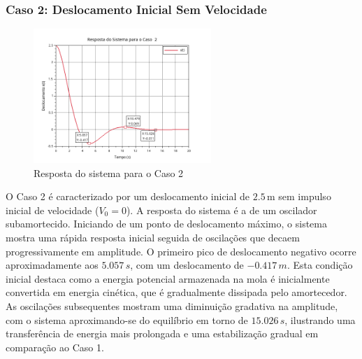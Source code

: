 \subsubsection{Caso 2: Deslocamento Inicial Sem Velocidade}
\begin{figure}[H]
    \centering
    \includegraphics[width=0.6\textwidth]{atividades/1-atividade/assets/caso2.png}
    \caption{Resposta do sistema para o Caso 2}
\end{figure}
O Caso 2 é caracterizado por um deslocamento inicial de \(2.5 \, \text{m}\) sem impulso inicial de velocidade (\(V_0 = 0\)). A resposta do sistema é a de um oscilador subamortecido. Iniciando de um ponto de deslocamento máximo, o sistema mostra uma rápida resposta inicial seguida de oscilações que decaem progressivamente em amplitude. O primeiro pico de deslocamento negativo ocorre aproximadamente aos \(5.057 \, s\), com um deslocamento de \(-0.417 \, m\). Esta condição inicial destaca como a energia potencial armazenada na mola é inicialmente convertida em energia cinética, que é gradualmente dissipada pelo amortecedor. As oscilações subsequentes mostram uma diminuição gradativa na amplitude, com o sistema aproximando-se do equilíbrio em torno de \(15.026 \, s\), ilustrando uma transferência de energia mais prolongada e uma estabilização gradual em comparação ao Caso 1.

